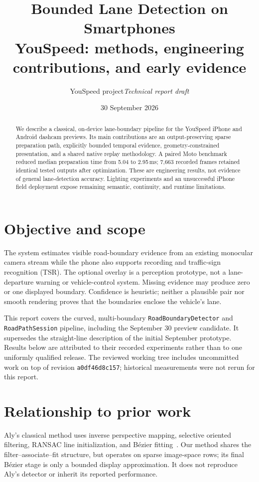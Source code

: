 \documentclass[11pt,a4paper]{article}
\title{\vspace{-15mm}\textbf{Bounded Lane Detection on Smartphones}\\[3pt]
  \large YouSpeed: methods, engineering contributions, and early evidence}
\author{YouSpeed project\quad\textit{Technical report draft}}
\date{30 September 2026}
\newcommand{\code}[1]{\texttt{\small #1}}
\begin{document}
\maketitle
\vspace{-7mm}
\begin{abstract}
\noindent
We describe a classical, on-device lane-boundary pipeline for the YouSpeed
iPhone and Android dashcam previews. Its main contributions are an
output-preserving sparse preparation path, explicitly bounded temporal evidence,
geometry-constrained presentation, and a shared native replay methodology.
A paired Moto benchmark reduced median preparation time from 5.04 to 2.95\,ms;
7,663 recorded frames retained identical tested outputs after optimization.
These are engineering results, not evidence of general lane-detection accuracy.
Lighting experiments and an unsuccessful iPhone field deployment expose remaining
semantic, continuity, and runtime limitations.
\end{abstract}

\section{Objective and scope}
The system estimates visible road-boundary evidence from an existing monocular
camera stream while the phone also supports recording and traffic-sign recognition
(TSR). The optional overlay is a perception prototype, not a lane-departure warning
or vehicle-control system. Missing evidence may produce zero or one displayed
boundary. Confidence is heuristic; neither a plausible pair nor smooth rendering
proves that the boundaries enclose the vehicle's lane.

This report covers the curved, multi-boundary \code{RoadBoundaryDetector} and
\code{RoadPathSession} pipeline, including the September 30 preview candidate.
It supersedes the straight-line description of the initial September prototype.
Results below are attributed to their recorded experiments rather than to one
uniformly qualified release. The reviewed working tree includes uncommitted work
on top of revision \code{a0df46d8c157}; historical measurements were not rerun for
this report.

\section{Relationship to prior work}
Aly's classical method uses inverse perspective mapping, selective oriented
filtering, RANSAC line initialization, and B\'ezier fitting~\cite{aly}.
Our method shares the filter--associate--fit structure, but operates on sparse
image-space rows; its final B\'ezier stage is only a bounded display approximation.
It does not reproduce Aly's detector or inherit its reported performance.
\end{document}
